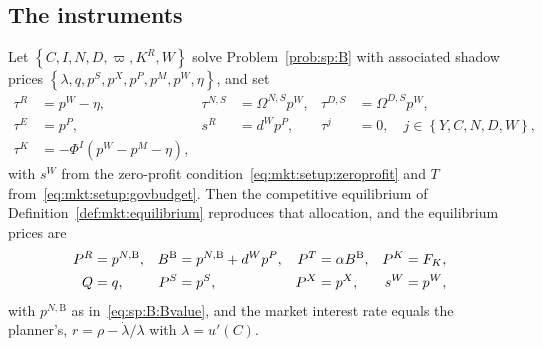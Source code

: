 \subsection{The instruments}\label{sec:mkt:B:instruments}

\begin{proposition}\label{prop:mkt:B:implementation}
Let $\left\{C,I,N,D,\varpi,K^R,W\right\}$ solve Problem~\ref{prob:sp:B} with associated shadow prices
$\left\{\lambda,q,p^S,p^X,p^P,p^M,p^W,\eta\right\}$, and set
\begin{align}
\tau^R &= p^W-\eta,
&
\tau^{N,S} &= \Omega^{N,S}p^W,
&
\tau^{D,S} &= \Omega^{D,S}p^W,
\label{eq:mkt:B:mass}
\\
\tau^E &= p^P,
&
s^R &= d^Wp^P,
&
\tau^j &= 0,\quad j\in\left\{Y,C,N,D,W\right\},
\label{eq:mkt:B:emission}
\\
\tau^K &= -\Phi^I\left(p^W-p^M-\eta\right),
&&&&
\label{eq:mkt:B:tauK}
\end{align}
with $s^W$ from the zero-profit condition~\eqref{eq:mkt:setup:zeroprofit} and $T$
from~\eqref{eq:mkt:setup:govbudget}. Then the competitive equilibrium of
Definition~\ref{def:mkt:equilibrium} reproduces that allocation, and the equilibrium prices are
\begin{align}
P^R &= p^{N,\mathrm B},
&
B^{\mathrm B} &= p^{N,\mathrm B}+d^Wp^P,
&
P^T &= \alpha B^{\mathrm B},
&
P^K &= F_K,
\notag\\
Q &= q,
&
P^S &= p^S,
&
P^X &= p^X,
&
s^W &= p^W,
\label{eq:mkt:B:prices}
\end{align}
with $p^{N,\mathrm B}$ as in~\eqref{eq:sp:B:Bvalue}, and the market interest rate equals the planner's,
$r=\rho-\dot\lambda/\lambda$ with $\lambda=u'(C)$.
\end{proposition}

